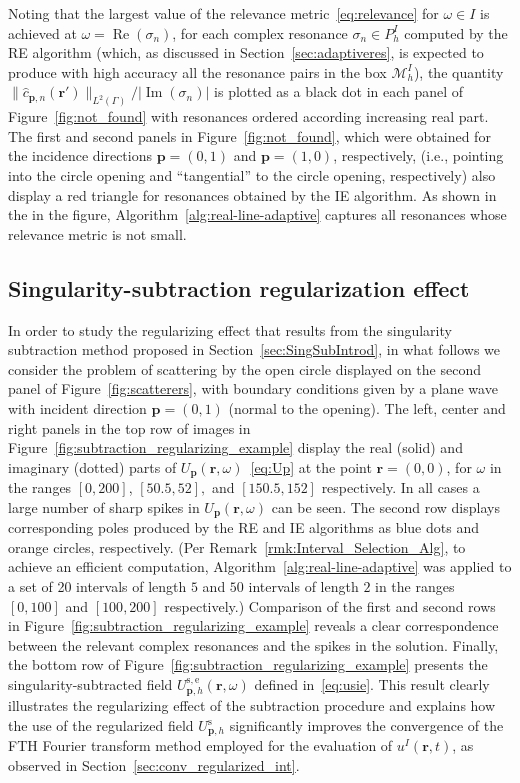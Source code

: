 \documentclass[11pt]{article}
\theoremstyle{plain}
\theoremstyle{remark}
\def \br{\mathbf{r}}
\def \bp{\mathbf{p}}
\renewcommand{\Re}{\operatorname{Re}}
\renewcommand{\Im}{\operatorname{Im}}
\begin{document}
Noting that the largest value of the relevance
metric~\eqref{eq:relevance} for $\omega \in I$ is achieved at
$\omega = \Re(\sigma_n)$, for each complex resonance
$\sigma_n \in P^I_h$ computed by the RE algorithm (which, as
discussed in Section~\ref{sec:adaptiveres}, is expected to produce with high accuracy all
the resonance pairs in the box $\mathcal{M}^I_h$), the quantity
$\parallel\widehat{c}_{\bp,n}(\br')\parallel_{L^2(\Gamma)} /
|\Im(\sigma_n)|$ is plotted as a black dot in each panel of
Figure~\ref{fig:not_found} with resonances ordered according
increasing real part. The first and second panels in
Figure~\ref{fig:not_found}, which were obtained for the incidence
directions $\bp = (0,1)$ and $\bp = (1,0)$, respectively, (i.e.,
pointing into the circle opening and ``tangential'' to the circle
opening, respectively) also display a red triangle for resonances obtained by the IE algorithm. As shown in the in the figure,
Algorithm~\ref{alg:real-line-adaptive} captures all resonances whose
relevance metric is not small.


\subsection{Singularity-subtraction regularization effect}\label{sec:SingSubEx}
In order to study the regularizing effect that results from the
singularity subtraction method proposed in
Section~\ref{sec:SingSubIntrod}, in what follows we consider the
problem of scattering by the open circle displayed on the second panel
of Figure~\ref{fig:scatterers}, with boundary conditions given by a
plane wave with incident direction $\bp = (0,1)$ (normal to the
opening). The left, center and right panels in the top row of images
in Figure~\ref{fig:subtraction_regularizing_example} display the real
(solid) and imaginary (dotted) parts of
$U_{\bp}(\br,\omega)$~\eqref{eq:Up} at the point $\br = (0,0)$, for
$\omega$ in the ranges $[0,200]$, $[50.5,52],$ and $[150.5,152]$
respectively. In all cases a large number of sharp spikes in
$U_{\bp}(\br,\omega)$ can be seen. The second row displays
corresponding poles produced by the RE and IE algorithms as
blue dots and orange circles, respectively. (Per
Remark~\ref{rmk:Interval_Selection_Alg}, to achieve an efficient
computation, Algorithm~\ref{alg:real-line-adaptive} was applied to a
set of 20 intervals of length $5$ and $50$ intervals of length $2$ in
the ranges $[0,100]$ and $[100,200]$ respectively.) Comparison of the
first and second rows in
Figure~\ref{fig:subtraction_regularizing_example} reveals a clear
correspondence between the relevant complex resonances and the spikes
in the solution. Finally, the bottom row of
Figure~\ref{fig:subtraction_regularizing_example} presents the
singularity-subtracted field $U_{\bp,h}^\mathrm{s,e}(\br,\omega)$
defined in~\eqref{eq:usie}. This result clearly illustrates the
regularizing effect of the subtraction procedure and explains how the
use of the regularized field $U_{\bp,h}^\mathrm{s}$ significantly
improves the convergence of the FTH Fourier transform method employed
for the evaluation of $u^{I}(\br,t)$, as observed in
Section~\ref{sec:conv_regularized_int}.
\end{document}
